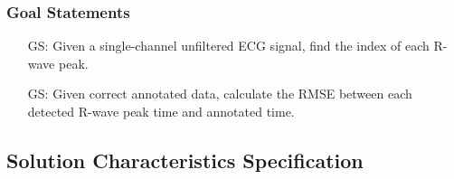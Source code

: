 \documentclass[12pt]{article}
\begin{document}

\subsubsection{Goal Statements}

\begin{itemize}

\item[GS\refstepcounter{goalnum}\thegoalnum \label{G_find_index}:] Given a
single-channel unfiltered ECG signal, find the index of each R-wave peak.

\item[GS\refstepcounter{goalnum}\thegoalnum \label{G_calculate_RMSE}:] Given
correct annotated data, calculate the RMSE between each detected R-wave peak
time and annotated time.

\end{itemize}

\subsection{Solution Characteristics Specification}


\end{document}
